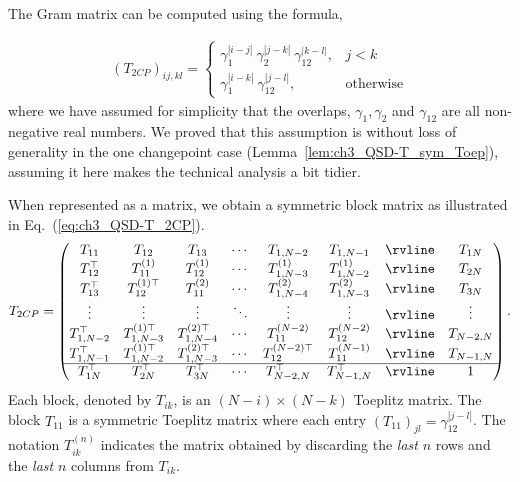 \begin{appendices}
The Gram matrix can be computed using the formula,

\begin{align}
    \label{eq:ch3_QSD-T_ijkl}
    (T_{2CP})_{ij,kl} =
    \begin{cases}
        \gamma_1^{|i-j|}\ \gamma_2^{|j-k|}\ \gamma_{12}^{|k-l|}, &j < k \\
        \gamma_1^{|i-k|}\ \gamma_{12}^{|j-l|},\ \hspace{30pt} &\text{otherwise}
    \end{cases} 
\end{align}
where we have assumed for simplicity that the overlaps, $\gamma_1, \gamma_2$ and $\gamma_{12}$ are all non-negative real numbers. 
We proved that this assumption is without loss of generality in the one changepoint case (Lemma~\ref{lem:ch3_QSD-T_sym_Toep}), assuming it here makes the technical analysis a bit tidier. 

When represented as a matrix, we obtain a symmetric block matrix as illustrated in Eq.~(\ref{eq:ch3_QSD-T_2CP}).
\begin{align}
    \label{eq:ch3_QSD-T_2CP}
    T_{2CP} =
    \begin{pmatrix}
        T_{11} & T_{12} & T_{13} & \cdots & T_{1,N-2} & T_{1,N-1} & \rvline & T_{1N} \\
        T_{12}^\top & T_{11}^{(1)} & T_{12}^{(1)} & \cdots & T_{1,N-3}^{(1)} & T_{1,N-2}^{(1)} & \rvline & T_{2N} \\
        T_{13}^\top & T_{12}^{(1)\top} & T_{11}^{(2)} & \cdots & T_{1,N-4}^{(2)} & T_{1, N-3}^{(2)} & \rvline & T_{3N} \\
        \vdots & \vdots & \vdots & \ddots & \vdots & \vdots & \rvline & \vdots \\
        T_{1,N-2}^\top & T_{1,N-3}^{(1)\top} & T_{1,N-4}^{(2)\top} & \cdots & T_{11}^{(N-2)} & T_{12}^{(N-2)} & \rvline & T_{N-2,N} \\
        T_{1,N-1}^\top & T_{1,N-2}^{(1)\top} & T_{1,N-3}^{(2)\top} & \cdots & T_{12}^{(N-2)\top} & T_{11}^{(N-1)} & \rvline & T_{N-1,N} \\
        \hline
        T_{1N}^\top & T_{2N}^\top & T_{3N}^\top & \cdots & T_{N-2,N}^\top & T_{N-1,N}^\top & \rvline & 1 \\
    \end{pmatrix}. 
\end{align}
Each block, denoted by $T_{ik}$, is an $(N-i) \times (N-k)$ Toeplitz matrix.
The block $T_{11}$ is a symmetric Toeplitz matrix where each entry $(T_{11})_{jl} = \gamma_{12}^{|j-l|}$.
The notation $T_{ik}^{(n)}$ indicates the matrix obtained by discarding the \emph{last} $n$ rows and the \emph{last} $n$ columns from $T_{ik}$.


\end{appendices}
